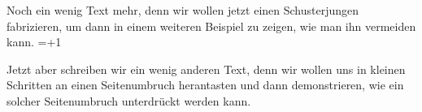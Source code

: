 \documentclass[a5paper]{article}
\begin{document}
\blindtext

\blindtext Noch ein wenig Text mehr, denn wir wollen jetzt einen Schusterjungen fabrizieren, um dann in einem weiteren
Beispiel zu zeigen, wie man ihn vermeiden kann. 
\looseness=+1  %

Jetzt aber schreiben wir ein wenig anderen Text, denn wir wollen uns in kleinen Schritten an einen
Seitenumbruch herantasten und dann demonstrieren, wie ein solcher Seitenumbruch unterdrückt werden kann.
\end{document}
